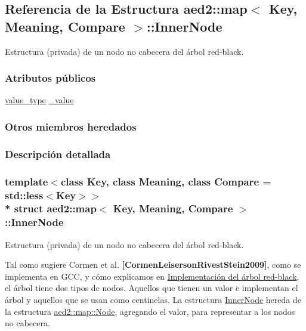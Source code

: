 \hypertarget{structaed2_1_1map_1_1InnerNode}{}\subsection{Referencia de la Estructura aed2\+:\+:map$<$ Key, Meaning, Compare $>$\+:\+:Inner\+Node}
\label{structaed2_1_1map_1_1InnerNode}


Estructura (privada) de un nodo no cabecera del árbol red-\/black.  


\subsubsection*{Atributos públicos}
\begin{DoxyCompactItemize}
\item 
\hyperlink{classaed2_1_1map_a719db98e0ff9a837610f76be33264680_a719db98e0ff9a837610f76be33264680}{value\+\_\+type} \hyperlink{structaed2_1_1map_1_1InnerNode_a53fd8a50986fec67601dd77c44c1657e_a53fd8a50986fec67601dd77c44c1657e}{\+\_\+value}
\end{DoxyCompactItemize}
\subsubsection*{Otros miembros heredados}


\subsubsection{Descripción detallada}
\subsubsection*{template$<$class Key, class Meaning, class Compare = std\+::less$<$\+Key$>$$>$\\*
struct aed2\+::map$<$ Key, Meaning, Compare $>$\+::\+Inner\+Node}

Estructura (privada) de un nodo no cabecera del árbol red-\/black. 

Tal como sugiere Cormen et al. {\bfseries [Cormen\+Leiserson\+Rivest\+Stein2009]}, como se implementa en G\+CC, y cómo explicamos en \hyperlink{Implementacion}{Implementación del árbol red-\/black}, el árbol tiene dos tipos de nodos. Aquellos que tienen un valor e implementan el árbol y aquellos que se usan como centinelas. La estructura \hyperlink{structaed2_1_1map_1_1InnerNode}{Inner\+Node} hereda de la estructura \hyperlink{structaed2_1_1map_1_1Node}{aed2\+::map\+::\+Node}, agregando el valor, para representar a los nodos no cabecera.

